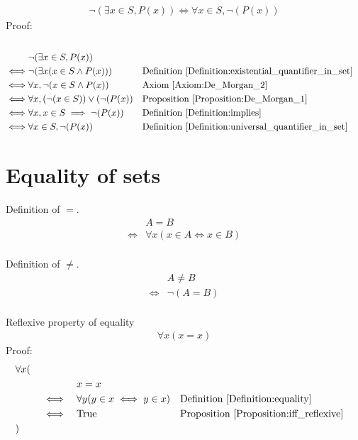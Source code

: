 \begin{prop}
\begin{align*}
\lnot (\exists x \in S, P(x)) \iff \forall x \in S, \lnot (P(x))
\end{align*} 
Proof: \\ \\
\begin{align*}
& \lnot (\exists x \in S, P(x)) \\
\iff & \lnot ( \exists x (x \in S \land P(x)) )
&& \text{Definition \ref{Definition:existential_quantifier_in_set}} \\
\iff & \forall x, \lnot (x \in S \land P(x))
&& \text{Axiom \ref{Axiom:De_Morgan_2}} \\
\iff & \forall x, (\lnot(x \in S)) \lor (\lnot (P(x))
&& \text{Proposition \ref{Proposition:De_Morgan_1}} \\
\iff & \forall x, x \in S \implies \lnot (P(x))
&& \text{Definition \ref{Definition:implies}} \\
\iff & \forall x \in S, \lnot (P(x))
&& \text{Definition \ref{Definition:universal_quantifier_in_set}} \\
\end{align*}
\end{prop}

\section{Equality of sets}
\begin{defn}
\label{Definition:equality}
Definition of $=$.
\begin{align*}
& A = B \\
\iff & \forall x (x \in A \iff x \in B) \\
\end{align*}
\end{defn}

\begin{defn}
Definition of $\neq$.
\begin{align*}
& A \neq B \\
\iff & \lnot (A = B) \\
\end{align*}
\end{defn}

\begin{prop}
Reflexive property of equality
\begin{align*}
\forall x (x = x)
\end{align*}
Proof:
\begin{align*}
& \forall x ( \\
& \quad &&  && x = x \\
& \quad && \iff && \forall y (y \in x \iff y \in x)
&& \text{Definition \ref{Definition:equality}} \\
& \quad && \iff && \text{True}
&& \text{Proposition \ref{Proposition:iff_reflexive}} \\
& )
\end{align*}
\end{prop}

